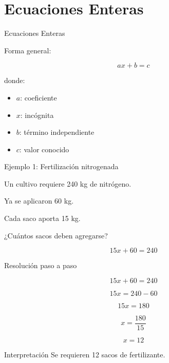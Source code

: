 \documentclass[handout,aspectratio=169]{beamer}
\begin{document}
	\section{Ecuaciones Enteras}
	
	\begin{frame}{Ecuaciones Enteras}
		
		Forma general:
		
		\[
		ax+b=c
		\]
		
		donde:
		
		\begin{itemize}
			\item \(a\): coeficiente
			\item \(x\): incógnita
			\item \(b\): término independiente
			\item \(c\): valor conocido
		\end{itemize}
		
	\end{frame}
	
	\begin{frame}{Ejemplo 1: Fertilización nitrogenada}
		
		Un cultivo requiere 240 kg de nitrógeno.
		
		Ya se aplicaron 60 kg.
		
		Cada saco aporta 15 kg.
		
		¿Cuántos sacos deben agregarse?
		
		\[
		15x + 60 = 240
		\]
		
	\end{frame}
	
	\begin{frame}{Resolución paso a paso}
		
		\[
		15x + 60 = 240
		\]
		
		\pause
		
		\[
		15x = 240 - 60
		\]
		
		\pause
		
		\[
		15x = 180
		\]
		
		\pause
		
		\[
		x = \frac{180}{15}
		\]
		
		\pause
		
		\[
		x = 12
		\]
		
		\begin{block}{Interpretación}
			Se requieren 12 sacos de fertilizante.
		\end{block}
		
	\end{frame}
	
\end{document}
